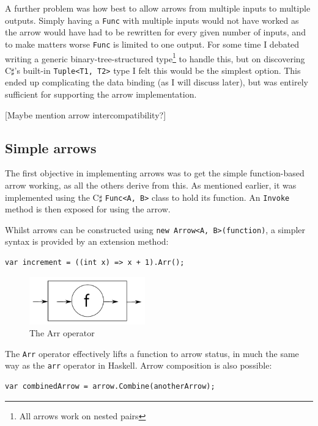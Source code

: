 \documentclass[12pt,twoside,notitlepage]{report}
\begin{document}
A further problem was how best to allow arrows from multiple inputs to multiple outputs. Simply having a \texttt{Func} with multiple inputs would not have worked as the arrow would have had to be rewritten for every given number of inputs, and to make matters worse \texttt{Func} is limited to one output. For some time I debated writing a generic binary-tree-structured type\footnote{All arrows work on nested pairs} to handle this, but on discovering C$\sharp$'s built-in \texttt{Tuple<T1, T2>} type I felt this would be the simplest option. This ended up complicating the data binding (as I will discuss later), but was entirely sufficient for supporting the arrow implementation.

[Maybe mention arrow intercompatibility?]

\subsection{Simple arrows} \label{sec:simple_arrow_implementation}

The first objective in implementing arrows was to get the simple function-based arrow working, as all the others derive from this. As mentioned earlier, it was implemented using the C$\sharp$ \texttt{Func<A, B>} class to hold its function. An \texttt{Invoke} method is then exposed for using the arrow.

Whilst arrows can be constructed using \texttt{new Arrow<A, B>(function)}, a simpler syntax is provided by an extension method:

\begin{lstlisting}[language={[Sharp]C}]
var increment = ((int x) => x + 1).Arr();
\end{lstlisting}

\begin{figure}[!ht]
  \centering
  \includegraphics[width=50mm]{fig/ArrOperator.pdf}
  \caption{The Arr operator}
  \label{fig:arr_operator}
\end{figure}

The \texttt{Arr} operator effectively lifts a function to arrow status, in much the same way as the \texttt{arr} operator in Haskell. Arrow composition is also possible:

\begin{lstlisting}[language={[Sharp]C}]
var combinedArrow = arrow.Combine(anotherArrow);
\end{lstlisting}
\end{document}
